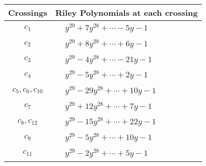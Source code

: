 \documentclass[1p]{elsarticle_modified}
\theoremstyle{definition}
\begin{document}
\begin{tabular}{m{50pt}|m{274pt}}
Crossings & \hspace{64pt}Riley Polynomials at each crossing \\
\hline $$\begin{aligned}c_{1}\end{aligned}$$&$\begin{aligned}
&y^{29}+7 y^{28}+\cdots-5 y-1
\end{aligned}$\\
\hline $$\begin{aligned}c_{2}\end{aligned}$$&$\begin{aligned}
&y^{29}+8 y^{28}+\cdots+6 y-1
\end{aligned}$\\
\hline $$\begin{aligned}c_{3}\end{aligned}$$&$\begin{aligned}
&y^{29}-4 y^{28}+\cdots-21 y-1
\end{aligned}$\\
\hline $$\begin{aligned}c_{4}\end{aligned}$$&$\begin{aligned}
&y^{29}-5 y^{28}+\cdots+2 y-1
\end{aligned}$\\
\hline $$\begin{aligned}c_{5},c_{6},c_{10}\end{aligned}$$&$\begin{aligned}
&y^{29}-29 y^{28}+\cdots+10 y-1
\end{aligned}$\\
\hline $$\begin{aligned}c_{7}\end{aligned}$$&$\begin{aligned}
&y^{29}+12 y^{28}+\cdots+7 y-1
\end{aligned}$\\
\hline $$\begin{aligned}c_{8},c_{12}\end{aligned}$$&$\begin{aligned}
&y^{29}-15 y^{28}+\cdots+22 y-1
\end{aligned}$\\
\hline $$\begin{aligned}c_{9}\end{aligned}$$&$\begin{aligned}
&y^{29}-5 y^{28}+\cdots+10 y-1
\end{aligned}$\\
\hline $$\begin{aligned}c_{11}\end{aligned}$$&$\begin{aligned}
&y^{29}-2 y^{28}+\cdots+5 y-1
\end{aligned}$\\
\hline
\end{tabular}\\~\\
\end{document}
